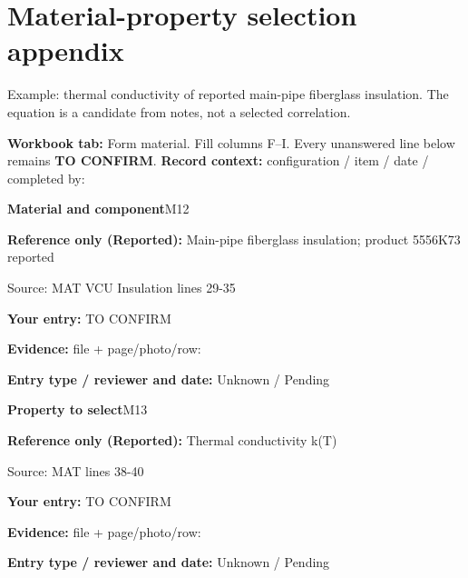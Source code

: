 \documentclass[11pt]{article}
\begin{document}
\clearpage\section{Material-property selection appendix}\label{form-material}
Example: thermal conductivity of reported main-pipe fiberglass insulation. The equation is a candidate from notes, not a selected correlation.
\par\textbf{Workbook tab:} Form material. Fill columns F--I. Every unanswered line below remains \textbf{TO CONFIRM}.
\textbf{Record context:} configuration / item / date / completed by: \hrulefill\par
\begin{minipage}{\textwidth}\small
{\color{navy}\bfseries Material and component}\hfill M12\par
\colorbox{pale}{\parbox{\dimexpr\linewidth-2\fboxsep\relax}{
\textbf{Reference only (Reported):} Main-pipe fiberglass insulation; product 5556K73 reported\par
{\footnotesize Source: MAT VCU Insulation lines 29-35}}}\par
\textbf{Your entry:} {\color{muted}TO CONFIRM}\enspace\hrulefill\par
{\footnotesize\textbf{Evidence:} file + page/photo/row: \hrulefill\par
\textbf{Entry type / reviewer and date:} Unknown / Pending\par
}\end{minipage}\par\vspace{5pt}
\begin{minipage}{\textwidth}\small
{\color{navy}\bfseries Property to select}\hfill M13\par
\colorbox{pale}{\parbox{\dimexpr\linewidth-2\fboxsep\relax}{
\textbf{Reference only (Reported):} Thermal conductivity k(T)\par
{\footnotesize Source: MAT lines 38-40}}}\par
\textbf{Your entry:} {\color{muted}TO CONFIRM}\enspace\hrulefill\par
{\footnotesize\textbf{Evidence:} file + page/photo/row: \hrulefill\par
\textbf{Entry type / reviewer and date:} Unknown / Pending\par
}\end{minipage}\par\vspace{5pt}
\end{document}

